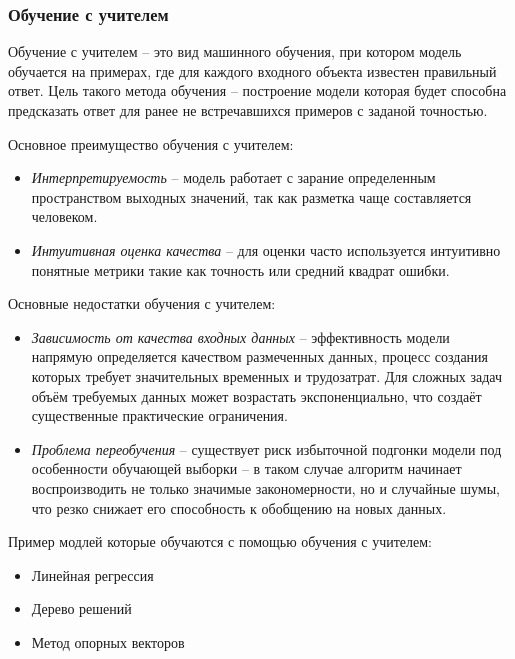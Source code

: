 \documentclass[../part_1.tex]{subfiles}
\begin{document}
\subsubsection{Обучение с учителем} %
    \label{sec:with_teacher}
    \par Обучение с учителем -- это вид машинного обучения, при котором модель обучается на примерах, где для каждого входного объекта известен правильный ответ. Цель такого метода обучения -- построение модели которая будет способна предсказать ответ для ранее не встречавшихся примеров с заданой точностью.
    \par Основное преимущество обучения с учителем:
    \begin{itemize}
        \item \textit{Интерпретируемость} -- модель работает с зарание определенным пространством выходных значений, так как разметка чаще составляется человеком.
        \item \textit{Интуитивная оценка качества} -- для оценки часто используется интуитивно понятные метрики такие как точность или средний квадрат ошибки. 
    \end{itemize}
    \par Основные недостатки обучения с учителем:
    \begin{itemize}
        \item \textit{Зависимость от качества входных данных} -- эффективность модели напрямую определяется качеством размеченных данных, процесс создания которых требует значительных временных и трудозатрат. Для сложных задач объём требуемых данных может возрастать экспоненциально, что создаёт существенные практические ограничения.
        \item \textit{Проблема переобучения} -- существует риск избыточной подгонки модели под особенности обучающей выборки -- в таком случае алгоритм начинает воспроизводить не только значимые закономерности, но и случайные шумы, что резко снижает его способность к обобщению на новых данных.
    \end{itemize}
    \par Пример модлей которые обучаются с помощью обучения с учителем:
    \begin{itemize}
        \item Линейная регрессия
        \item Дерево решений
        \item Метод опорных векторов
    \end{itemize}
    
\end{document}
